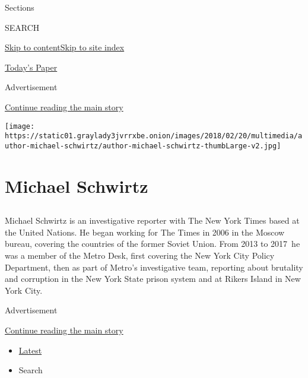 Sections

SEARCH

\protect\hyperlink{site-content}{Skip to
content}\protect\hyperlink{site-index}{Skip to site index}

\href{https://myaccount.nytimes3xbfgragh.onion/auth/login?response_type=cookie\&client_id=vi}{}

\href{https://www.nytimes3xbfgragh.onion/section/todayspaper}{Today's
Paper}

Advertisement

\protect\hyperlink{after-top}{Continue reading the main story}

\texttt{[image: https://static01.graylady3jvrrxbe.onion/images/2018/02/20/multimedia/author-michael-schwirtz/author-michael-schwirtz-thumbLarge-v2.jpg]}

\hypertarget{michael-schwirtz}{%
\section{Michael Schwirtz}\label{michael-schwirtz}}

\subsection{}

Michael Schwirtz is an investigative reporter with The New York Times
based at the United Nations. He began working for The Times in 2006 in
the Moscow bureau, covering the countries of the former Soviet Union.
From 2013 to 2017~he was a member of the Metro Desk, first covering the
New York City Policy Department, then as part of Metro's investigative
team, reporting about brutality and corruption in the New York State
prison system and at Rikers Island in New York City.~

Advertisement

\protect\hyperlink{after-mid1}{Continue reading the main story}

\begin{itemize}
\tightlist
\item
  \protect\hyperlink{stream-panel}{Latest}
\item
  Search
\end{itemize}

